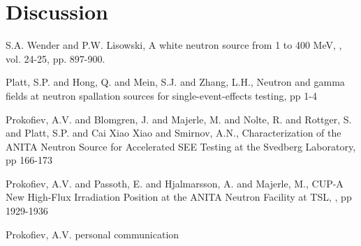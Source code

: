 \documentclass[11pt,a4paper]{IEEEtran}
\begin{document}
\section{Discussion}


\begin{thebibliography}{99} %

S.A. Wender and P.W. Lisowski,
\newblock A white neutron source from 1 to 400 MeV,										%
, vol. 24-25, pp. 897-900.					%

Platt, S.P. and Hong, Q. and Mein, S.J. and Zhang, L.H.,
\newblock Neutron and gamma fields at neutron spallation sources for single-event-effects testing,		%
 pp 1-4			%

Prokofiev, A.V. and Blomgren, J. and Majerle, M. and Nolte, R. and Rottger, S. and Platt, S.P. and Cai Xiao Xiao and Smirnov, A.N.,
\newblock Characterization of the ANITA Neutron Source for Accelerated SEE Testing at the Svedberg Laboratory,		%
 pp 166-173 									%

Prokofiev, A.V. and Passoth, E. and Hjalmarsson, A. and Majerle, M.,
\newblock CUP-A New High-Flux Irradiation Position at the ANITA Neutron Facility at TSL,		%
, pp 1929-1936 							%

Prokofiev, A.V.
\newblock personal communication

\end{thebibliography}

\cleardoublepage

\todos
\end{document}
